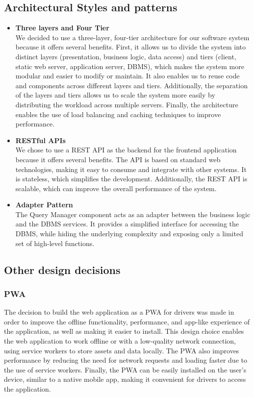 \subsection{Architectural Styles and patterns}
\begin{itemize}
    \item \textbf{Three layers and Four Tier}\\
          We decided to use a three-layer, four-tier architecture for our software system because it offers several benefits. First, it allows us to divide the system into distinct layers (presentation, business logic, data access) and tiers (client, static web server, application server, DBMS), which makes the system more modular and easier to modify or maintain. It also enables us to reuse code and components across different layers and tiers. Additionally, the separation of the layers and tiers allows us to scale the system more easily by distributing the workload across multiple servers. Finally, the architecture enables the use of load balancing and caching techniques to improve performance.
    \item \textbf{RESTful APIs}\\
          We chose to use a REST API as the backend for the frontend application because it offers several benefits. The API is based on standard web technologies, making it easy to consume and integrate with other systems. It is stateless, which simplifies the development. Additionally, the REST API is scalable, which can improve the overall performance of the system.
    \item \textbf{Adapter Pattern}\\
          The Query Manager component acts as an adapter between the business logic and the DBMS services. It provides a simplified interface for accessing the DBMS, while hiding the underlying complexity and exposing only a limited set of high-level functions.
\end{itemize}
\subsection{Other design decisions}
\subsubsection{PWA}
The decision to build the web application as a PWA for drivers was made in order to improve the offline functionality, performance, and app-like experience of the application, as well as making it easier to install. This design choice enables the web application to work offline or with a low-quality network connection, using service workers to store assets and data locally. The PWA also improves performance by reducing the need for network requests and loading faster due to the use of service workers. Finally, the PWA can be easily installed on the user's device, similar to a native mobile app, making it convenient for drivers to access the application.
